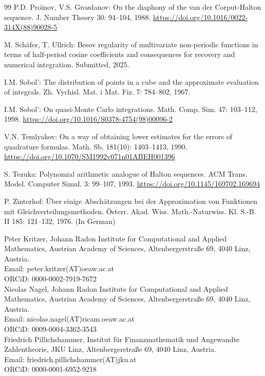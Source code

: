 \documentclass[12pt, a4paper]{article}
\begin{document}
\begin{thebibliography}{99}
 P.D. Pro{\u\i}nov, V.S. Grozdanov: On the diaphony of the van der Corput-Halton sequence. J. Number Theory 30: 94--104, 1988. \href{https://doi.org/10.1016/0022-314X(88)90028-5}{https://doi.org/10.1016/0022-314X(88)90028-5}



 M. Sch\"afer, T. Ullrich: Besov regularity of multivariate non-periodic functions in terms of half-period cosine coefficients and consequences for recovery and numerical integration. Submitted, 2025. %

 I.M. Sobol': The distribution of points in a cube and the approximate evaluation of integrals. Zh. Vychisl. Mat. i Mat. Fiz. 7: 784--802, 1967.

 I.M. Sobol': On quasi-Monte Carlo integrations. Math. Comp. Sim. 47: 103--112, 1998. \href{https://doi.org/10.1016/S0378-4754(98)00096-2}{https://doi.org/10.1016/S0378-4754(98)00096-2}

 V.N. Temlyakov: On a way of obtaining lower estimates for the errors of quadrature formulas. Math. Sb. 181(10): 1403--1413, 1990. \href{https://doi.org/10.1070/SM1992v071n01ABEH001396}{https://doi.org/10.1070/SM1992v071n01ABEH001396}

 S. Tezuka: Polynomial arithmetic analogue of Halton sequences. ACM Trans. Model. Computer Simul. 3: 99--107, 1993. \href{https://doi.org/10.1145/169702.169694}{https://doi.org/10.1145/169702.169694}

 P. Zinterhof: \"Uber einige Absch\"atzungen bei der Approximation von Funktionen mit Gleichverteilungsmethoden. \"Osterr. Akad. Wiss. Math.-Naturwiss. Kl. S.-B. II 185: 121--132, 1976. (In German)
\end{thebibliography}


\noindent Peter Kritzer, Johann Radon Institute for Computational and Applied Mathematics, Austrian Academy of Sciences, Altenbergerstra{\ss}e 69, 4040 Linz, Austria.\\ Email: peter.kritzer(AT)oeaw.ac.at\\ ORCiD: 0000-0002-7919-7672\\

\noindent Nicolas Nagel, Johann Radon Institute for Computational and Applied Mathematics, Austrian Academy of Sciences, Altenbergerstra{\ss}e 69, 4040 Linz, Austria.\\ Email: nicolas.nagel(AT)ricam.oeaw.ac.at\\ ORCiD: 0009-0004-3362-3543\\

\noindent Friedrich Pillichshammer, Institut f\"{u}r Finanzmathematik und Angewandte Zahlentheorie, JKU Linz, Altenbergerstra{\ss}e 69, 4040 Linz, Austria.\\ Email: friedrich.pillichshammer(AT)jku.at\\ ORCiD: 0000-0001-6952-9218
\end{document}
